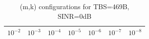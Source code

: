 \begin{table}[ht]
\centering
\caption{(m,k) configurations for TBS=469B, SINR=0dB}
\label{tab:conf_{469B_0dB}}
\begin{tabular}{ccccccc}
\hline
$10^{-2}$ & $10^{-3}$ & $10^{-4}$ & $10^{-5}$ & $10^{-6}$ & $10^{-7}$ & $10^{-8}$ \\ \hline
\hline
\end{tabular}
\end{table}